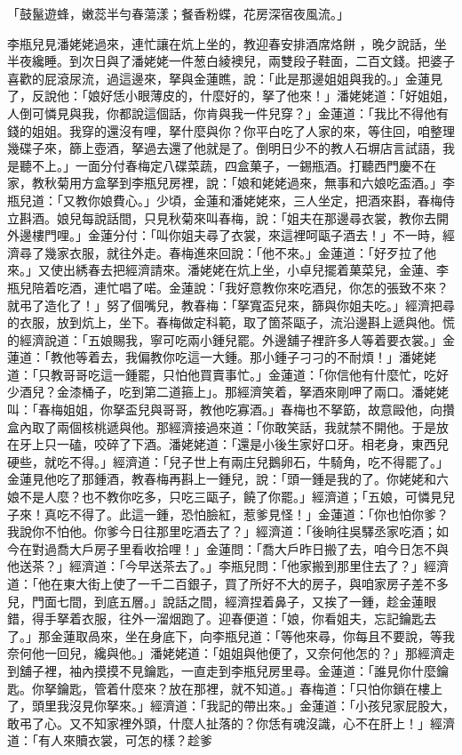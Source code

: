 「鼓鬣遊蜂，嫩蕊半勻春蕩漾；餐香粉蝶，花房深宿夜風流。」

李瓶兒見潘姥姥過來，連忙讓在炕上坐的，教迎春安排酒席烙餅 ，晚夕說話，坐半夜纔睡。到次日與了潘姥姥一件葱白綾襖兒，兩雙段子鞋面，二百文錢。把婆子喜歡的屁滾尿流，過這邊來，拏與金蓮瞧，說：「此是那邊姐姐與我的。」金蓮見了，反說他：「娘好恁小眼薄皮的，什麼好的，拏了他來！」潘姥姥道：「好姐姐，人倒可憐見與我，你都說這個話，你肯與我一件兒穿？」金蓮道：「我比不得他有錢的姐姐。我穿的還沒有哩，拏什麼與你？你平白吃了人家的來，等住回，咱整理幾碟子來，篩上壺酒，拏過去還了他就是了。倒明日少不的教人石塀店言試語，我是聽不上。」一面分付春梅定八碟菜蔬，四盒菓子，一錫瓶酒。打聽西門慶不在家，教秋菊用方盒拏到李瓶兒房裡，說：「娘和姥姥過來，無事和六娘吃盃酒。」李瓶兒道：「又教你娘費心。」少頃，金蓮和潘姥姥來，三人坐定，把酒來斟，春梅侍立斟酒。娘兒每說話間，只見秋菊來叫春梅，說：「姐夫在那邊尋衣裳，教你去開外邊樓門哩。」金蓮分付：「叫你姐夫尋了衣裳，來這裡呵甌子酒去！」不一時，經濟尋了幾家衣服，就往外走。春梅進來回說：「他不來。」金蓮道：「好歹拉了他來。」又使出綉春去把經濟請來。潘姥姥在炕上坐，小卓兒擺着菓菜兒，金蓮、李瓶兒陪着吃酒，連忙唱了喏。金蓮說：「我好意教你來吃酒兒，你怎的張致不來？就弔了造化了！」努了個嘴兒，教春梅：「拏寬盃兒來，篩與你姐夫吃。」經濟把尋的衣服，放到炕上，坐下。春梅做定科範，取了箇茶甌子，流沿邊斟上遞與他。慌的經濟說道：「五娘賜我，寧可吃兩小鍾兒罷。外邊舖子裡許多人等着要衣裳。」金蓮道：「教他等着去，我偏教你吃這一大鍾。那小鍾子刁刁的不耐煩！」潘姥姥道：「只教哥哥吃這一鍾罷，只怕他買賣事忙。」金蓮道：「你信他有什麼忙，吃好少酒兒？金漆桶子，吃到第二道箍上」。那經濟笑着，拏酒來剛呷了兩口。潘姥姥叫：「春梅姐姐，你拏盃兒與哥哥，教他吃寡酒。」春梅也不拏筯，故意毆他，向攢盒內取了兩個核桃遞與他。那經濟接過來道：「你敢笑話，我就禁不開他。于是放在牙上只一磕，咬碎了下酒。潘姥姥道：「還是小後生家好口牙。相老身，東西兒硬些，就吃不得。」經濟道：「兒子世上有兩庄兒鵝卵石，牛騎角，吃不得罷了。」金蓮見他吃了那鍾酒，教春梅再斟上一鍾兒，說：「頭一鍾是我的了。你姥姥和六娘不是人麼？也不教你吃多，只吃三甌子，饒了你罷。」經濟道；「五娘，可憐見兒子來！真吃不得了。此這一鍾，恐怕臉紅，惹爹見怪！」金蓮道：「你也怕你爹？我說你不怕他。你爹今日往那里吃酒去了？」經濟道：「後晌往吳驛丞家吃酒；如今在對過喬大戶房子里看收拾哩！」金蓮問：「喬大戶昨日搬了去，咱今日怎不與他送茶？」經濟道：「今早送茶去了。」李瓶兒問：「他家搬到那里住去了？」經濟道：「他在東大街上使了一千二百銀子，買了所好不大的房子，與咱家房子差不多兒，門面七間，到底五層。」說話之間，經濟捏着鼻子，又挨了一鍾，趁金蓮眼錯，得手拏着衣服，往外一溜烟跑了。迎春便道：「娘，你看姐夫，忘記鑰匙去了。」那金蓮取咼來，坐在身底下，向李瓶兒道：「等他來尋，你每且不要說，等我奈何他一回兒，纔與他。」潘姥姥道：「姐姐與他便了，又奈何他怎的？」那經濟走到舖子裡，袖內摸摸不見鑰匙，一直走到李瓶兒房里尋。金蓮道：「誰見你什麼鑰匙。你拏鑰匙，管着什麼來？放在那裡，就不知道。」春梅道：「只怕你鎖在樓上了，頭里我沒見你拏來。」經濟道：「我記的帶出來。」金蓮道：「小孩兒家屁股大，敢弔了心。又不知家裡外頭，什麼人扯落的？你恁有魂沒識，心不在肝上！」經濟道：「有人來贖衣裳，可怎的樣？趁爹